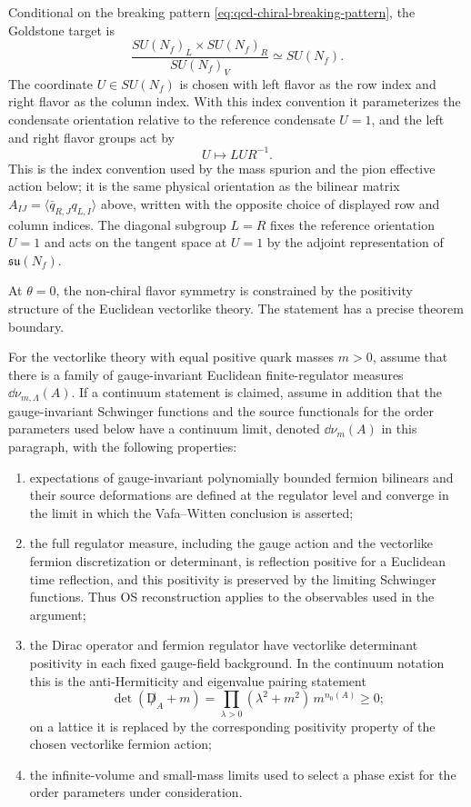 \begin{definition}
\label{def:qcd-chiral-goldstone-datum}
Conditional on the breaking pattern
\eqref{eq:qcd-chiral-breaking-pattern}, the Goldstone target is
\[
  \frac{SU(N_f)_L\times SU(N_f)_R}{SU(N_f)_V}
  \simeq SU(N_f).
\]
The coordinate \(U\in SU(N_f)\) is chosen with left flavor as the row index
and right flavor as the column index.  With this index convention it
parameterizes the condensate orientation relative to the reference condensate
\(U=1\), and the left and right flavor groups act by
\[
  U\longmapsto LUR^{-1}.
\]
This is the index convention used by the mass spurion and the pion effective
action below; it is the same physical orientation as the bilinear matrix
\(A_{IJ}=\langle\bar q_{R,J}q_{L,I}\rangle\) above, written with the opposite
choice of displayed row and column indices.
The diagonal subgroup \(L=R\) fixes the reference orientation \(U=1\) and acts
on the tangent space at \(U=1\) by the adjoint representation of
\(\mathfrak{su}(N_f)\).
\end{definition}

At \(\theta=0\), the non-chiral flavor symmetry is constrained by the
positivity structure of the Euclidean vectorlike theory.  The statement has a
precise theorem boundary.

\begin{hypothesis}
\label{hyp:vafa-witten-measure-data}
For the vectorlike theory with equal positive quark masses \(m>0\), assume that
there is a family of gauge-invariant Euclidean finite-regulator measures
\(\dd\nu_{m,\Lambda}(A)\).  If a continuum statement is claimed, assume in
addition that the gauge-invariant Schwinger functions and the source
functionals for the order parameters used below have a continuum limit, denoted
\(\dd\nu_m(A)\) in this paragraph, with the following properties:
\begin{enumerate}[label=\roman*.]
\item expectations of gauge-invariant polynomially bounded fermion bilinears and
their source deformations are defined at the regulator level and converge in
the limit in which the Vafa--Witten conclusion is asserted;
\item the full regulator measure, including the gauge action and the vectorlike
fermion discretization or determinant, is reflection positive for a Euclidean
time reflection, and this positivity is preserved by the limiting Schwinger
functions.  Thus OS reconstruction applies to the observables used in the
argument;
\item the Dirac operator and fermion regulator have vectorlike determinant
positivity in each fixed gauge-field background.  In the continuum notation
this is the anti-Hermiticity and eigenvalue pairing statement
\[
  \det(\not D_A+m)
  =
  \prod_{\lambda>0}(\lambda^2+m^2)\,m^{n_0(A)}
  \geq0;
\]
on a lattice it is replaced by the corresponding positivity property of the
chosen vectorlike fermion action;
\item the infinite-volume and small-mass limits used to select a phase exist
for the order parameters under consideration.
\end{enumerate}
\end{hypothesis}

